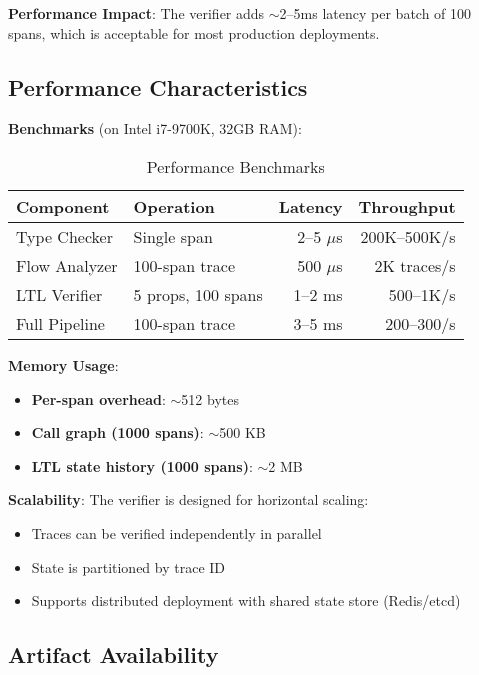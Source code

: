 \textbf{Performance Impact}: The verifier adds $\sim$2--5ms latency per batch of 100 spans, which is acceptable for most production deployments.

\subsection{Performance Characteristics}
\label{sec:impl-performance}

\textbf{Benchmarks} (on Intel i7-9700K, 32GB RAM):

\begin{table}[h]
\caption{Performance Benchmarks}
\label{tab:performance}
\small
\centering
\begin{tabular}{llrr}
\toprule
\textbf{Component} & \textbf{Operation} & \textbf{Latency} & \textbf{Throughput} \\
\midrule
Type Checker & Single span & 2--5 $\mu$s & 200K--500K/s \\
Flow Analyzer & 100-span trace & 500 $\mu$s & 2K traces/s \\
LTL Verifier & 5 props, 100 spans & 1--2 ms & 500--1K/s \\
Full Pipeline & 100-span trace & 3--5 ms & 200--300/s \\
\bottomrule
\end{tabular}
\vspace{-0.1in}
\end{table}

\textbf{Memory Usage}:
\begin{itemize}
\item \textbf{Per-span overhead}: $\sim$512 bytes
\item \textbf{Call graph (1000 spans)}: $\sim$500 KB
\item \textbf{LTL state history (1000 spans)}: $\sim$2 MB
\end{itemize}

\textbf{Scalability}: The verifier is designed for horizontal scaling:
\begin{itemize}
\item Traces can be verified independently in parallel
\item State is partitioned by trace ID
\item Supports distributed deployment with shared state store (Redis/etcd)
\end{itemize}

\subsection{Artifact Availability}
\label{sec:impl-artifacts}

